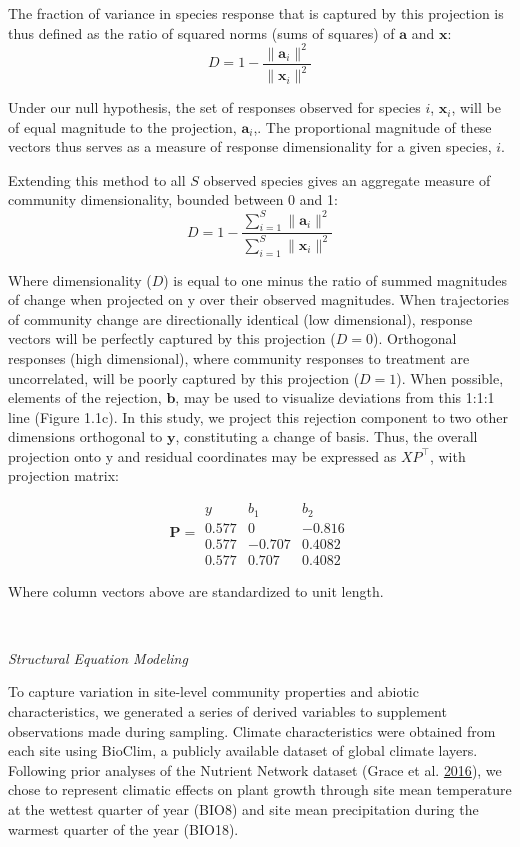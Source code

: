 \documentclass[twoside,12pt,final]{ucthesis-CA2012}
\begin{document}
\begin{ucmainmatter}
The fraction of variance in species response that is captured by this projection is thus defined as the ratio of squared norms (sums of squares) of \(\mathbf{a}\) and \(\mathbf{x}\):
\[D = 1 - \frac{\|\mathbf{a}_i\|^2}{\|\mathbf{x}_i\|^2}\]

Under our null hypothesis, the set of responses observed for species \(i\), \(\mathbf{x}_i\), will be of equal magnitude to the projection, \(\mathbf{a}_i\),. The proportional magnitude of these vectors thus serves as a measure of response dimensionality for a given species, \(i\).

Extending this method to all \(S\) observed species gives an aggregate measure of community dimensionality, bounded between 0 and 1:
\[D = 1 - \frac{\sum_{i = 1}^{S}\|\mathbf{a}_i\|^2}{\sum_{i = 1}^{S}\|\mathbf{x}_i\|^2}\]

Where dimensionality (\(D\)) is equal to one minus the ratio of summed magnitudes of change when projected on y over their observed magnitudes. When trajectories of community change are directionally identical (low dimensional), response vectors will be perfectly captured by this projection (\(D = 0\)). Orthogonal responses (high dimensional), where community responses to treatment are uncorrelated, will be poorly captured by this projection (\(D = 1\)).
When possible, elements of the rejection, \(\mathbf{b}\), may be used to visualize deviations from this 1:1:1 line (Figure 1.1c). In this study, we project this rejection component to two other dimensions orthogonal to \(\mathbf{y}\), constituting a change of basis. Thus, the overall projection onto y and residual coordinates may be expressed as \(XP^\top\), with projection matrix:

\[
\mathbf{P} = 
\begin{matrix}
y & b_1 & b_2 \\
\hline
0.577 & 0 & -0.816 \\
0.577 & -0.707 & 0.4082 \\
0.577 & 0.707 & 0.4082 
\end{matrix}
\]

Where column vectors above are standardized to unit length.

~

\emph{Structural Equation Modeling}

To capture variation in site-level community properties and abiotic characteristics, we generated a series of derived variables to supplement observations made during sampling. Climate characteristics were obtained from each site using BioClim, a publicly available dataset of global climate layers. Following prior analyses of the Nutrient Network dataset (Grace et al. \protect\hyperlink{ref-Grace2016a}{2016}), we chose to represent climatic effects on plant growth through site mean temperature at the wettest quarter of year (BIO8) and site mean precipitation during the warmest quarter of the year (BIO18).


\end{ucmainmatter}
\end{document}
